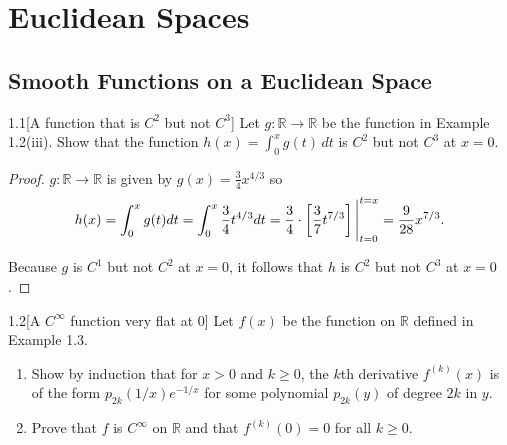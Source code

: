 \chapter{Euclidean Spaces}

\section{Smooth Functions on a Euclidean Space}

\begin{problem}{1.1}[A function that is \(C^{2}\) but not \(C^{3}\)]
Let \(g\colon\mathbb{R}\to\mathbb{R}\) be the function in Example 1.2(iii). Show that the function \(h(x)=\int_{0}^{x}g(t)\,dt\) is \(C^{2}\) but not \(C^{3}\) at \(x=0\).
\end{problem}

\begin{proof}
    \( g: \mathbb{R} \to \mathbb{R} \) is given by \( g(x) = \frac{3}{4}x^{4/3} \) so
    \[
        h(x) = \int^{x}_{0} g(t) dt = \int^{x}_{0} \frac{3}{4}t^{4/3} dt = \frac{3}{4}\cdot \left[\frac{3}{7} t^{7/3}\right]\Bigg{\vert}^{t=x}_{t=0} = \frac{9}{28} x^{7/3}.
    \]

    Because \( g \) is \( C^{1} \) but not \( C^{2} \) at \( x = 0 \), it follows that \( h \) is \( C^{2} \) but not \( C^{3} \) at \( x = 0 \).
\end{proof}

\begin{problem}{1.2}[A \(C^{\infty}\) function very flat at \(0\)]
Let \(f(x)\) be the function on \(\mathbb{R}\) defined in Example 1.3.
\begin{enumerate}[label={(\alph*)}]
    \item Show by induction that for \(x>0\) and \(k\geq 0\), the \(k\)th derivative \(f^{(k)}(x)\) is of the form \(p_{2k}(1/x)e^{-1/x}\) for some polynomial \(p_{2k}(y)\) of degree \(2k\) in \(y\).
    \item Prove that \(f\) is \(C^{\infty}\) on \(\mathbb{R}\) and that \(f^{(k)}(0)=0\) for all \(k\geq 0\).
\end{enumerate}
\end{problem}

